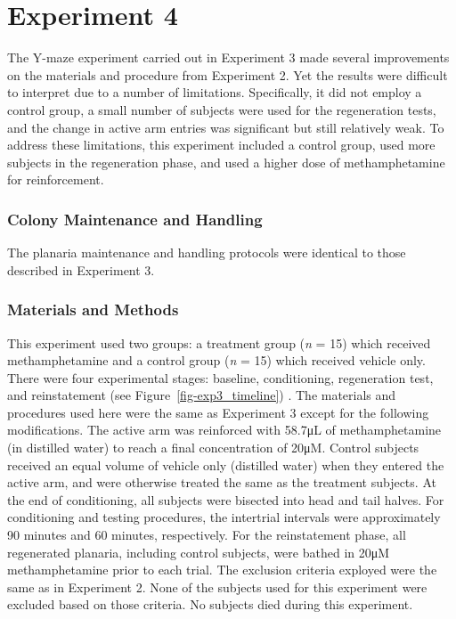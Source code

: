 \documentclass[
  jou,
  floatsintext,
  longtable,
  nolmodern,
  notxfonts,
  notimes,
  donotrepeattitle,
  colorlinks=true,linkcolor=blue,citecolor=blue,urlcolor=blue]{apa7}
\begin{document}
\section{Experiment 4}\label{sec-experiment-4}

The Y-maze experiment carried out in Experiment 3 made several
improvements on the materials and procedure from Experiment 2. Yet the
results were difficult to interpret due to a number of limitations.
Specifically, it did not employ a control group, a small number of
subjects were used for the regeneration tests, and the change in active
arm entries was significant but still relatively weak. To address these
limitations, this experiment included a control group, used more
subjects in the regeneration phase, and used a higher dose of
methamphetamine for reinforcement.

\subsubsection{Colony Maintenance and
Handling}\label{colony-maintenance-and-handling-3}

The planaria maintenance and handling protocols were identical to those
described in Experiment 3.

\subsubsection{Materials and Methods}\label{materials-and-methods}

This experiment used two groups: a treatment group (\emph{n} = 15) which
received methamphetamine and a control group (\emph{n} = 15) which
received vehicle only. There were four experimental stages: baseline,
conditioning, regeneration test, and reinstatement (see
Figure~\ref{fig-exp3_timeline}) . The materials and procedures used here
were the same as Experiment 3 except for the following modifications.
The active arm was reinforced with 58.7μL of methamphetamine (in
distilled water) to reach a final concentration of 20μM. Control
subjects received an equal volume of vehicle only (distilled water) when
they entered the active arm, and were otherwise treated the same as the
treatment subjects. At the end of conditioning, all subjects were
bisected into head and tail halves. For conditioning and testing
procedures, the intertrial intervals were approximately 90 minutes and
60 minutes, respectively. For the reinstatement phase, all regenerated
planaria, including control subjects, were bathed in 20μM
methamphetamine prior to each trial. The exclusion criteria exployed
were the same as in Experiment 2. None of the subjects used for this
experiment were excluded based on those criteria. No subjects died
during this experiment.
\end{document}
